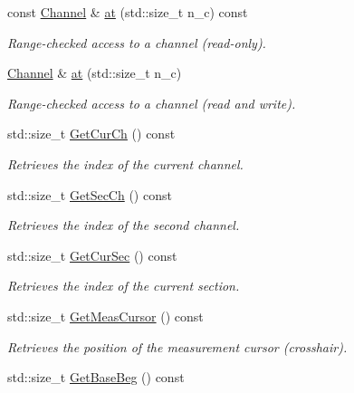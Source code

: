 \begin{DoxyCompactItemize}
const \hyperlink{classChannel}{Channel} \& \hyperlink{classRecording_a5c79855f2de693656909f3ea9b43b943}{at} (std::size\_\-t n\_\-c) const 
\begin{DoxyCompactList}\small\item\em Range-\/checked access to a channel (read-\/only). \item\end{DoxyCompactList}\item 
\hyperlink{classChannel}{Channel} \& \hyperlink{classRecording_a0a788926cbef764f62fca685b92a2e15}{at} (std::size\_\-t n\_\-c)
\begin{DoxyCompactList}\small\item\em Range-\/checked access to a channel (read and write). \item\end{DoxyCompactList}\item 
std::size\_\-t \hyperlink{classRecording_ad216e46012a6b7630d4baeac15b110a9}{GetCurCh} () const 
\begin{DoxyCompactList}\small\item\em Retrieves the index of the current channel. \item\end{DoxyCompactList}\item 
std::size\_\-t \hyperlink{classRecording_ab870119d64fd52d656cb4d7882b20fab}{GetSecCh} () const 
\begin{DoxyCompactList}\small\item\em Retrieves the index of the second channel. \item\end{DoxyCompactList}\item 
std::size\_\-t \hyperlink{classRecording_aa6b87b7a6e22b86f1fe200c278fe65a6}{GetCurSec} () const 
\begin{DoxyCompactList}\small\item\em Retrieves the index of the current section. \item\end{DoxyCompactList}\item 
std::size\_\-t \hyperlink{classRecording_a11d7a0afbb103e89cdefd0c60a1e1d9f}{GetMeasCursor} () const 
\begin{DoxyCompactList}\small\item\em Retrieves the position of the measurement cursor (crosshair). \item\end{DoxyCompactList}\item 
std::size\_\-t \hyperlink{classRecording_a2f7d618c4debfa908e10e30512afb798}{GetBaseBeg} () const 

\end{DoxyCompactItemize}
